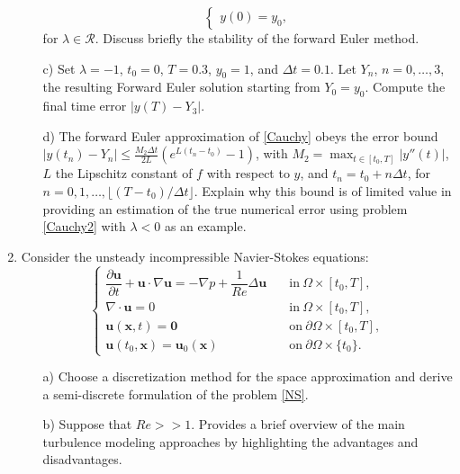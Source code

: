 \documentclass{article}
\newcommand{\GS}[1]{{\color{red} GS: #1}}
\begin{document}
\begin{enumerate}
\begin{itemize}
\begin{equation}
\begin{cases}
y(0) = y_0,
\end{cases}
\end{equation}
for $\lambda \in \mathcal{R}$. Discuss briefly the stability of the forward Euler method.
\item[c)] Set $\lambda = -1$, $t_0 = 0$, $T=0.3$, $y_0 = 1$, and $\Delta t = 0.1$. Let $Y_n$, $n=0,\dots,3$, the resulting Forward Euler solution starting from $Y_0=y_0$. Compute the final time error $|y(T) - Y_3|$.
\item[d)] The forward Euler approximation of \eqref{Cauchy} obeys the error bound $|y(t_n)-Y_n|\le \frac{M_2\Delta t}{2L}(e^{L(t_n-t_0)}-1)$, with $M_2=\max_{t\in [t_0,T]} |y''(t)|$, $L$ the Lipschitz constant of $f$ with respect to $y$,  and  $t_n=t_0+n\Delta t$, for $n=0,1,\dots,\lfloor(T-t_0)/\Delta t\rfloor$. Explain why this bound is of limited value in providing an estimation of the true numerical error using problem \eqref{Cauchy2} with $\lambda<0$ as an example. 
\end{itemize} 
\item
Consider the unsteady incompressible Navier-Stokes equations:
\begin{equation}\label{NS}
\begin{cases}
\dfrac{\partial \mathbf{u}}{\partial t} + \mathbf{u} \cdot \nabla \mathbf{u} = -\nabla p + \dfrac{1}{Re} \Delta \mathbf{u} &  \quad \text{in}~\Omega \times \left[t_0, T\right],  \\
\nabla \cdot \mathbf{u} = 0 &  \quad \text{in}~\Omega \times \left[t_0, T\right], \\
\mathbf{u}(\mathbf{x}, t) = \mathbf{0} & \quad \text{on}~\partial\Omega \times \left[t_0, T\right], \\
\mathbf{u}(t_0,\mathbf{x}) = \mathbf{u}_0(\mathbf{x}) &  \quad \text{on}~\partial\Omega \times \{t_0\}.
\end{cases}
\end{equation}
\begin{itemize}
\item[a)] Choose a discretization method for the space approximation and derive a semi-discrete formulation of the problem \eqref{NS}. 


\item[b)] Suppose that $Re >> 1$. Provides a brief overview of the main turbulence modeling approaches by highlighting the advantages and disadvantages. 
\end{itemize}
\end{enumerate}
\end{document}
